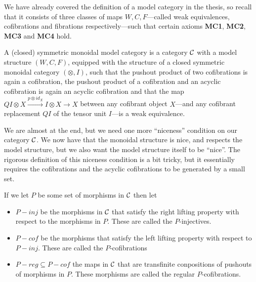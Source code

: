 We have already covered the definition of a model category in the thesis, so recall that it consists of three classes of maps $W, C, F$---called weak equivalences, cofibrations and fibrations respectively---such that certain axioms \textbf{MC1}, \textbf{MC2}, \textbf{MC3} and \textbf{MC4} hold. 

\begin{definition}
A (closed) symmetric monoidal model category is a category $\mathcal{C}$ with a model structure $(W, C, F)$, equipped with the structure of a closed symmetric monoidal category $(\otimes, I)$, such that the pushout product of two cofibrations is again a cofibration, the pushout product of a cofibration and an acyclic cofibration is again an acyclic cofibration and that the map $QI\otimes X \overset{p\otimes id_X}\longrightarrow I\otimes X \longrightarrow X$ between any cofibrant object $X$---and any cofibrant replacement $QI$ of the tensor unit $I$---is a weak equivalence. 
\end{definition}

We are almost at the end, but we need one more ``niceness'' condition on our category $\mathcal{C}$. We now have that the monoidal structure is nice, and respects the model structure, but we also want the model structure itself to be ``nice''. The rigorous definition of this niceness condition is a bit tricky, but it essentially requires the cofibrations and the acyclic cofibrations to be generated by a small set. 

If we let $P$ be some set of morphisms in $\mathcal{C}$ then let 
\begin{itemize}
    \item $P-inj$ be the morphisms in $\mathcal{C}$ that satisfy the right lifting property with respect to the morphisms in $P$. These are called the $P$-injectives.
    \item $P-cof$ be the morphisms that satisfy the left lifting property with respect to $P-inj$. These are called the $P$-cofibrations
    \item $P-reg \subseteq P-cof$ the maps in $\mathcal{C}$ that are transfinite conpositions of pushouts of morphisms in $P$. These morphisms are called the regular $P$-cofibrations. 
\end{itemize}

